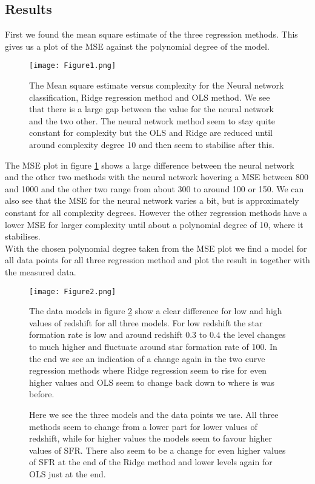 \documentclass[11pt, A4paper, english]{article}
\begin{document}
\begin{multicols}{2}
		\section{Results}
First we found the mean square estimate of the three regression methods. This gives us a plot of the MSE against the polynomial degree of the model.
			\begin{figure}[H]
\texttt{[image: Figure1.png]}
\caption{The Mean square estimate versus complexity for the Neural network classification, Ridge regression method and OLS method. We see that there is a large gap between the value for the neural network and the two other. The neural network method seem to stay quite constant for complexity but the OLS and Ridge are reduced until around complexity degree 10 and then seem to stabilise after this.}
\label{MSE}
			\end{figure}
The MSE plot in figure \ref{MSE} shows a large difference between the neural network and the other two methods with the neural network hovering a MSE between 800 and 1000 and the other two range from about 300 to around 100 or 150. We can also see that the MSE for the neural network varies a bit, but is approximately constant for all complexity degrees. However the other regression methods have a lower MSE for larger complexity until about a polynomial degree of 10, where it stabilises. \\
With the chosen polynomial degree taken from the MSE plot we find a model for all data points for all three regression method and plot the result in together with the measured data.
			\begin{figure}[H]
\texttt{[image: Figure2.png]}
\caption{Here we see the three models and the data points we use. All three methods seem to change from a lower part for lower values of redshift, while for higher values the models seem to favour higher values of SFR. There also seem to be a change for even higher values of SFR at the end of the Ridge method and lower levels again for OLS just at the end.}
\label{Models}
The data models in figure \ref{Models} show a clear difference for low and high values of redshift for all three models. For low redshift the star formation rate is low and around redshift $0.3$ to $0.4$ the level changes to much higher and fluctuate around star formation rate of 100. In the end we see an indication of a change again in the two curve regression methods where Ridge regression seem to rise for even higher values and OLS seem to change back down to where is was before.
			\end{figure}


\end{multicols}
\end{document}
